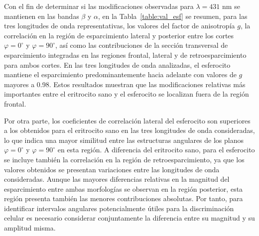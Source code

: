 Con el fin de determinar si las modificaciones observadas para $\lambda=431$ nm se mantienen en las bandas $\beta$ y $\alpha$, en la Tabla~\ref{table:val_esf} se resumen, para las tres longitudes de onda representativas, los valores del factor de anisotropía $g$, la correlación en la región de esparcimiento lateral y posterior entre los cortes $\varphi=0^\circ$ y $\varphi=90^\circ$, así como las contribuciones de la sección transversal de esparcimiento integradas en las regiones frontal, lateral y de retroesparcimiento para ambos cortes. En las tres longitudes de onda analizadas, el esferocito mantiene el esparcimiento predominantemente hacia adelante con valores de $g$ mayores a 0.98. Estos resultados muestran que las modificaciones relativas más importantes entre el eritrocito sano y el esferocito se localizan fuera de la región frontal.

Por otra parte, los coeficientes de correlación lateral del esferocito son superiores a los obtenidos para el eritrocito sano en las tres longitudes de onda consideradas, lo que indica una mayor similitud entre las estructuras angulares de los planos $\varphi=0^\circ$ y $\varphi=90^\circ$ en esta región. A diferencia del eritrocito sano, para el esferocito se incluye también la correlación en la región de retroesparcimiento, ya que los valores obtenidos se presentan variaciones entre las longitudes de onda consideradas. Aunque las mayores diferencias relativas en la magnitud del esparcimiento entre ambas morfologías se observan en la región posterior, esta región presenta también las menores contribuciones absolutas. Por tanto, para identificar intervalos angulares potencialmente útiles para la discriminación celular es necesario considerar conjuntamente la diferencia entre su magnitud y su amplitud misma.

